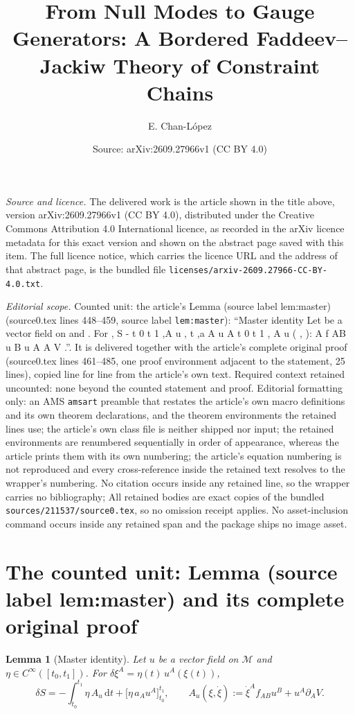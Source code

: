 \documentclass[10pt,a4paper]{amsart}
\title[From Null Modes to Gauge Generators: A Bordered Faddeev--Jackiw Theory of Constraint Chains]{From Null Modes to Gauge Generators: A Bordered Faddeev--Jackiw Theory of Constraint Chains}
\author{E. Chan-L\'opez}
\date{Source: arXiv:2609.27966v1 (CC BY 4.0)}
\newcommand{\Mm}{\mathcal{M}}
\newcommand{\dd}{\mathrm{d}}
\newcommand{\pd}[1]{\partial_{#1}}
\theoremstyle{plain}
\newtheorem{lemma}[theorem]{Lemma}
\theoremstyle{definition}
\theoremstyle{remark}
\begin{document}
\maketitle

\noindent\emph{Source and licence.} The delivered work is the article shown in the title above, version arXiv:2609.27966v1 (CC BY 4.0), distributed under the Creative Commons Attribution 4.0 International licence, as recorded in the arXiv licence metadata for this exact version and shown on the abstract page saved with this item. The full licence notice, which carries the licence URL and the address of that abstract page, is the bundled file \texttt{licenses/arxiv-2609.27966-CC-BY-4.0.txt}.
\par\smallskip

\noindent\textit{Editorial scope.} Counted unit: the article's Lemma (source label lem:master) (source0.tex lines 448--459, source label \texttt{lem:master}): ``Master identity Let be a vector field on and . For , S - t 0 t 1 ,A u , t ,a A u A t 0 t 1 , A u ( , ): A f AB u B u A A V .''. It is delivered together with the article's complete original proof (source0.tex lines 461--485, one proof environment adjacent to the statement, 25 lines), copied line for line from the article's own text. Required context retained uncounted: none beyond the counted statement and proof. Editorial formatting only: an AMS \texttt{amsart} preamble that restates the article's own macro definitions and its own theorem declarations, and the theorem environments the retained lines use; the article's own class file is neither shipped nor input; the retained environments are renumbered sequentially in order of appearance, whereas the article prints them with its own numbering; the article's equation numbering is not reproduced and every cross-reference inside the retained text resolves to the wrapper's numbering. No citation occurs inside any retained line, so the wrapper carries no bibliography; All retained bodies are exact copies of the bundled \texttt{sources/211537/source0.tex}, so no omission receipt applies. No asset-inclusion command occurs inside any retained span and the package ships no image asset.


\section{The counted unit: Lemma (source label lem:master) and its complete original proof}

	\begin{lemma}[Master identity]
		\label{lem:master}
		Let $u$ be a vector field on $\Mm$ and $\eta\in C^{\infty}([t_{0},t_{1}])$. For
		$\delta\xi^{A}=\eta(t)\,u^{A}(\xi(t))$,
		\begin{equation}
			\delta S=-\int_{t_{0}}^{t_{1}}\eta\,A_{u}\,\dd t
			+\bigl[\eta\,a_{A}u^{A}\bigr]_{t_{0}}^{t_{1}},
			\qquad
			A_{u}(\xi,\dot\xi):=\dot\xi^{A}f_{AB}u^{B}+u^{A}\pd{A}V .
			\label{eq:master}
		\end{equation}
	\end{lemma}
\end{document}
